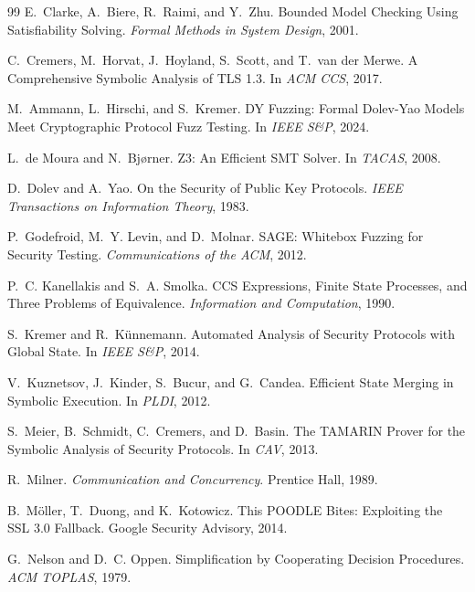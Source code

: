 \documentclass[10pt,twocolumn]{article}
\begin{document}
\begin{thebibliography}{99}
E.~Clarke, A.~Biere, R.~Raimi, and Y.~Zhu.
\newblock Bounded Model Checking Using Satisfiability Solving.
\newblock \emph{Formal Methods in System Design}, 2001.

C.~Cremers, M.~Horvat, J.~Hoyland, S.~Scott, and T.~van der Merwe.
\newblock A Comprehensive Symbolic Analysis of TLS 1.3.
\newblock In \emph{ACM CCS}, 2017.

M.~Ammann, L.~Hirschi, and S.~Kremer.
\newblock DY Fuzzing: Formal Dolev-Yao Models Meet Cryptographic Protocol Fuzz Testing.
\newblock In \emph{IEEE S\&P}, 2024.

L.~de Moura and N.~Bj\o rner.
\newblock Z3: An Efficient SMT Solver.
\newblock In \emph{TACAS}, 2008.

D.~Dolev and A.~Yao.
\newblock On the Security of Public Key Protocols.
\newblock \emph{IEEE Transactions on Information Theory}, 1983.

P.~Godefroid, M.~Y. Levin, and D.~Molnar.
\newblock SAGE: Whitebox Fuzzing for Security Testing.
\newblock \emph{Communications of the ACM}, 2012.

P.~C. Kanellakis and S.~A. Smolka.
\newblock CCS Expressions, Finite State Processes, and Three Problems of Equivalence.
\newblock \emph{Information and Computation}, 1990.

S.~Kremer and R.~K\"unnemann.
\newblock Automated Analysis of Security Protocols with Global State.
\newblock In \emph{IEEE S\&P}, 2014.

V.~Kuznetsov, J.~Kinder, S.~Bucur, and G.~Candea.
\newblock Efficient State Merging in Symbolic Execution.
\newblock In \emph{PLDI}, 2012.

S.~Meier, B.~Schmidt, C.~Cremers, and D.~Basin.
\newblock The TAMARIN Prover for the Symbolic Analysis of Security Protocols.
\newblock In \emph{CAV}, 2013.

R.~Milner.
\newblock \emph{Communication and Concurrency}.
\newblock Prentice Hall, 1989.

B.~M\"oller, T.~Duong, and K.~Kotowicz.
\newblock This POODLE Bites: Exploiting the SSL 3.0 Fallback.
\newblock Google Security Advisory, 2014.


G.~Nelson and D.~C. Oppen.
\newblock Simplification by Cooperating Decision Procedures.
\newblock \emph{ACM TOPLAS}, 1979.


\end{thebibliography}
\end{document}
